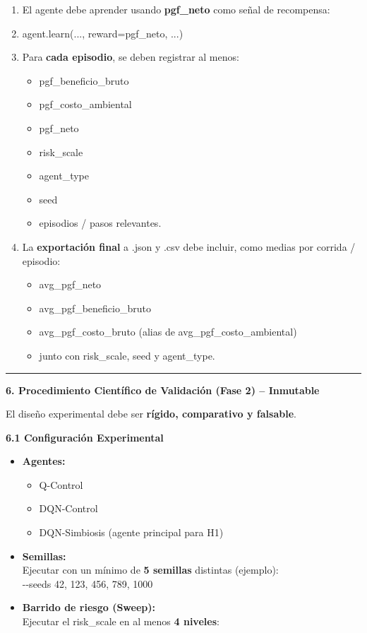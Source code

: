 \begin{enumerate}
\def\labelenumi{\arabic{enumi}.}
\item
  El agente debe aprender usando \textbf{pgf\_neto} como señal de
  recompensa:
\item
  agent.learn(..., reward=pgf\_neto, ...)
\item
  Para \textbf{cada episodio}, se deben registrar al menos:

  \begin{itemize}
  \item
    pgf\_beneficio\_bruto
  \item
    pgf\_costo\_ambiental
  \item
    pgf\_neto
  \item
    risk\_scale
  \item
    agent\_type
  \item
    seed
  \item
    episodios / pasos relevantes.
  \end{itemize}
\item
  La \textbf{exportación final} a .json y .csv debe incluir, como medias
  por corrida / episodio:

  \begin{itemize}
  \item
    avg\_pgf\_neto
  \item
    avg\_pgf\_beneficio\_bruto
  \item
    avg\_pgf\_costo\_bruto (alias de avg\_pgf\_costo\_ambiental)
  \item
    junto con risk\_scale, seed y agent\_type.
  \end{itemize}
\end{enumerate}

\begin{center}\rule{0.5\linewidth}{0.5pt}\end{center}

\textbf{6. Procedimiento Científico de Validación (Fase 2) -- Inmutable}

El diseño experimental debe ser \textbf{rígido, comparativo y falsable}.

\textbf{6.1 Configuración Experimental}

\begin{itemize}
\item
  \textbf{Agentes:}

  \begin{itemize}
  \item
    Q-Control
  \item
    DQN-Control
  \item
    DQN-Simbiosis (agente principal para H1)
  \end{itemize}
\item
  \textbf{Semillas:}\\
  Ejecutar con un mínimo de \textbf{5 semillas} distintas (ejemplo):\\
  -\/-seeds 42, 123, 456, 789, 1000
\item
  \textbf{Barrido de riesgo (Sweep):}\\
  Ejecutar el risk\_scale en al menos \textbf{4 niveles}:
\end{itemize}

